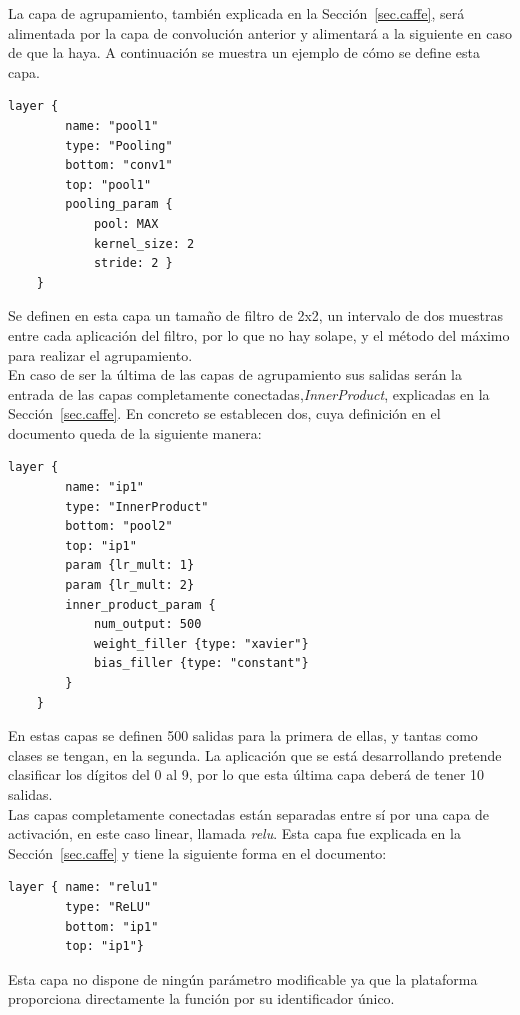 	La capa de agrupamiento, también explicada en la Sección~\ref{sec.caffe}, será alimentada por la capa de convolución anterior y alimentará a la siguiente en caso de que la haya. A continuación se muestra un ejemplo de cómo se define esta capa.
	\vspace{10pt}
	\begin{lstlisting}[frame=single]
	layer {
		name: "pool1"
		type: "Pooling"
		bottom: "conv1"
		top: "pool1"
		pooling_param {
			pool: MAX
			kernel_size: 2
			stride: 2 }
	}	
	\end{lstlisting}
	
	Se definen en esta capa un tamaño de filtro de 2x2, un intervalo de dos muestras entre cada aplicación del filtro, por lo que no hay solape, y el método del máximo para realizar el agrupamiento.\\

	En caso de ser la última de las capas de agrupamiento sus salidas serán la entrada de las capas completamente conectadas,\textit{InnerProduct}, explicadas en la Sección~\ref{sec.caffe}. En concreto se establecen dos, cuya definición en el documento queda de la siguiente manera: 
	\vspace{10pt}
	\begin{lstlisting}[frame=single]
	layer {
		name: "ip1"
		type: "InnerProduct"
		bottom: "pool2"
		top: "ip1"
		param {lr_mult: 1}
		param {lr_mult: 2}
		inner_product_param {
			num_output: 500
			weight_filler {type: "xavier"}
			bias_filler {type: "constant"}
		}
	}	
	\end{lstlisting}
	
	En estas capas se definen 500 salidas para la primera de ellas, y tantas como clases se tengan, en la segunda. La aplicación que se está desarrollando pretende clasificar los dígitos del 0 al 9, por lo que esta última capa deberá de tener 10 salidas.\\

	Las capas completamente conectadas están separadas entre sí por una capa de activación, en este caso linear, llamada \textit{\acrshort{relu}}. Esta capa fue explicada en la Sección~\ref{sec.caffe} y tiene la siguiente forma en el documento:
	\vspace{10pt}
	\begin{lstlisting}[frame=single]
	layer { name: "relu1"
		type: "ReLU"
		bottom: "ip1"
		top: "ip1"}	
	\end{lstlisting}
	
	Esta capa no dispone de ningún parámetro modificable ya que la plataforma proporciona directamente la función por su identificador único.\\
	
